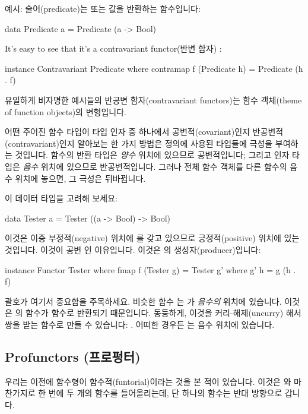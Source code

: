 \documentclass[DaoFP]{subfiles}
\begin{document}
예시: 술어(predicate)는  또는  값을 반환하는 함수입니다:
\begin{haskell}
data Predicate a = Predicate (a -> Bool)
\end{haskell}
It's easy to see that it's a contravariant functor(반변 함자) :
\begin{haskell}
instance Contravariant Predicate where
  contramap f (Predicate h) = Predicate (h . f)
\end{haskell}

유일하게 비자명한 예시들의 반공변 함자(contravariant functors)는 함수 객체(theme of function objects)의 변형입니다.

어떤 주어진 함수 타입이 타입 인자 중 하나에서 공변적(covariant)인지 반공변적(contravariant)인지 알아보는 한 가지 방법은 정의에 사용된 타입들에 극성을 부여하는 것입니다. 함수의 반환 타입은 \emph{양수} 위치에 있으므로 공변적입니다; 그리고 인자 타입은 \emph{음수} 위치에 있으므로 반공변적입니다. 그러나 전체 함수 객체를 다른 함수의 음수 위치에 놓으면, 그 극성은 뒤바뀝니다.

이 데이터 타입을 고려해 보세요:
\begin{haskell}
data Tester a = Tester ((a -> Bool) -> Bool)
\end{haskell}
이것은 이중 부정적(negative) 위치에 를 갖고 있으므로 긍정적(positive) 위치에 있는 것입니다. 이것이 공변 인 이유입니다. 이것은 의 생성자(producer)입니다:

\begin{haskell}
instance Functor Tester where
  fmap f (Tester g) = Tester g'
    where g' h = g (h . f)
\end{haskell}

괄호가 여기서 중요함을 주목하세요. 비슷한 함수 는 가 \emph{음수의} 위치에 있습니다. 이것은 의 함수가  함수로 반환되기 때문입니다. 동등하게, 이것을 커리-해제(uncurry) 해서 쌍을 받는 함수로 만들 수 있습니다: . 어떠한 경우든 는 음수 위치에 있습니다.

\subsection{Profunctors (프로펑터)}

우리는 이전에 함수형이 함수적(funtorial)이라는 것을 본 적이 있습니다. 이것은 와 마찬가지로 한 번에 두 개의 함수를 들어올리는데, 단 하나의 함수는 반대 방향으로 갑니다.
\end{document}
